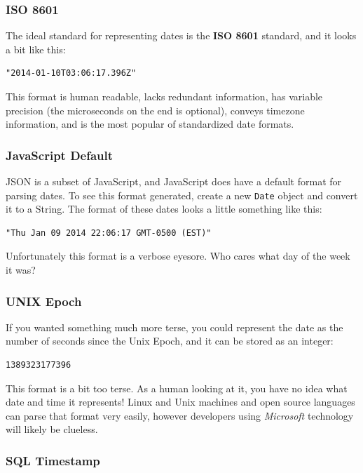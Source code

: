 \documentclass{book}
\begin{document}
\subsubsection{ISO 8601}

The ideal standard for representing dates is the \textbf{ISO 8601} \cite{ISO8601} standard, and it looks a bit like this:

\begin{verbatim}
"2014-01-10T03:06:17.396Z"
\end{verbatim}

This format is human readable, lacks redundant information, has variable precision (the microseconds on the end is optional), conveys timezone information, and is the most popular of standardized date formats.

\subsubsection{JavaScript Default}

JSON is a subset of JavaScript, and JavaScript does have a default format for parsing dates. To see this format generated, create a new \texttt{Date} object and convert it to a String. The format of these dates looks a little something like this:

\begin{verbatim}
"Thu Jan 09 2014 22:06:17 GMT-0500 (EST)"
\end{verbatim}

Unfortunately this format is a verbose eyesore. Who cares what day of the week it was?

\subsubsection{UNIX Epoch}

If you wanted something much more terse, you could represent the date as the number of seconds since the Unix Epoch, and it can be stored as an integer:

\begin{verbatim}
1389323177396
\end{verbatim}

This format is a bit too terse. As a human looking at it, you have no idea what date and time it represents! Linux and Unix machines and open source languages can parse that format very easily, however developers using \emph{Microsoft} technology will likely be clueless.

\subsubsection{SQL Timestamp}
\end{document}
